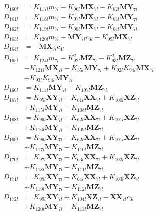 \begin{multicols}{2}
\begin{align}
D_{160l} &= K_{117l}m_{7l} - K_{96l}\mathbf{MX}_{7l} - K_{62l}\mathbf{MY}_{7l} \nonumber \\
D_{161l} &= K_{118l}m_{7l} - K_{97l}\mathbf{MX}_{7l} - K_{63l}\mathbf{MY}_{7l} \nonumber \\
D_{162l} &= K_{119l}m_{7l} - K_{98l}\mathbf{MX}_{7l} - K_{64l}\mathbf{MY}_{7l} \nonumber \\
D_{163l} &= K_{120l}m_{7l} - \mathbf{MY}_{7l}c_{3l} - K_{99l}\mathbf{MX}_{7l} \nonumber \\
D_{164l} &= -\mathbf{MX}_{7l}c_{4l} \nonumber \\
D_{165l} &= K_{124l}m_{7l} - K_{92l}^2\mathbf{MZ}_{7l} - K_{93l}^2\mathbf{MZ}_{7l}  \nonumber \\
&- K_{121l}\mathbf{MX}_{7l} - K_{85l}\mathbf{MY}_{7l} + K_{92l}K_{94l}\mathbf{MX}_{7l}  \nonumber \\
&+ K_{93l}K_{94l}\mathbf{MY}_{7l} \nonumber \\
D_{166l} &= K_{114l}\mathbf{MY}_{7l} - K_{107l}\mathbf{MZ}_{7l} \nonumber \\
D_{167l} &= K_{95l}\mathbf{XY}_{7l} - K_{61l}\mathbf{XX}_{7l} + K_{100l}\mathbf{XZ}_{7l}  \nonumber \\
&+ K_{115l}\mathbf{MY}_{7l} - K_{108l}\mathbf{MZ}_{7l} \nonumber \\
D_{168l} &= K_{96l}\mathbf{XY}_{7l} - K_{62l}\mathbf{XX}_{7l} + K_{101l}\mathbf{XZ}_{7l}  \nonumber \\
&+ K_{116l}\mathbf{MY}_{7l} - K_{109l}\mathbf{MZ}_{7l} \nonumber \\
D_{169l} &= K_{96l}\mathbf{XY}_{7l} - K_{62l}\mathbf{XX}_{7l} + K_{101l}\mathbf{XZ}_{7l}  \nonumber \\
&+ K_{117l}\mathbf{MY}_{7l} - K_{110l}\mathbf{MZ}_{7l} \nonumber \\
D_{170l} &= K_{97l}\mathbf{XY}_{7l} - K_{63l}\mathbf{XX}_{7l} + K_{102l}\mathbf{XZ}_{7l}  \nonumber \\
&+ K_{118l}\mathbf{MY}_{7l} - K_{111l}\mathbf{MZ}_{7l} \nonumber \\
D_{171l} &= K_{98l}\mathbf{XY}_{7l} - K_{64l}\mathbf{XX}_{7l} + K_{103l}\mathbf{XZ}_{7l}  \nonumber \\
&+ K_{119l}\mathbf{MY}_{7l} - K_{112l}\mathbf{MZ}_{7l} \nonumber \\
D_{172l} &= K_{99l}\mathbf{XY}_{7l} + K_{104l}\mathbf{XZ}_{7l} - \mathbf{XX}_{7l}c_{3l}  \nonumber \\
&+ K_{120l}\mathbf{MY}_{7l} - K_{113l}\mathbf{MZ}_{7l} \nonumber \\

\end{align}
\end{multicols}
